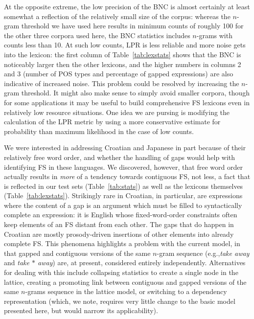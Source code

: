\documentclass[11pt,letterpaper]{article}
\makeatletter
\def \eg {e.g.,\@ }
\newcommand{\gap}{$*$\xspace}
\newcommand{\ex}[1]{\textit{#1}\xspace}
\newcommand{\tabref}[2][]{Table#1~\ref{#2}\xspace}
\makeatother
\begin{document}
At the opposite extreme, the low precision of the BNC is almost certainly at least somewhat a reflection of the relatively small size of the corpus: whereas the $n$-gram threshold we have used here results in minimum counts of roughly 100 for the other three corpora used here, the BNC statistics includes $n$-grams with counts less than 10. At such low counts, LPR is less reliable and more noise gets into the lexicon: the first column of \tabref{tab:lexstats} shows that the BNC is noticeably larger then the other lexicons, and the higher numbers in columns 2 and 3 (number of POS types and percentage of gapped expressions) are also indicative of increased noise.  This problem could be resolved by increasing the $n$-gram threshold. It might also make sense to simply avoid smaller corpora, though for some applications it may be useful to build comprehensive FS lexicons even in relatively low resource situations. One idea we are pursing is modifying the calculation of the LPR metric by using a more conservative estimate for probability than maximum likelihood in the case of low counts.

We were interested in addressing Croatian and Japanese in part because of their relatively free word order, and whether the handling of gaps would help with identifying FS in these languages. We discovered, however, that free word order actually results in \emph{more} of a tendency towards contiguous FS, not less, a fact that is reflected in our test sets (\tabref{tab:stats}) as well as the lexicons themselves (\tabref{tab:lexstats}). Strikingly rare in Croatian, in particular, are expressions where the content of a gap is an argument which must be filled to syntactically complete an expression: it is English whose fixed-word-order constraints often keep elements of an FS distant from each other. The gaps that do happen in Croatian are mostly prosody-driven insertions of other elements into already complete FS. This phenomena highlights a problem with the current model, in that gapped and contiguous versions of the same $n$-gram sequence (\eg \ex{take away} and \ex{take \gap away}) are, at present, considered entirely independently. Alternatives for dealing with this include collapsing statistics to create a single node in the lattice, creating a promoting link between contiguous and gapped versions of the same $n$-grams sequence in the lattice model, or switching to a dependency representation (which, we note, requires very little change to the basic model presented here, but would narrow its applicability). 
\end{document}
